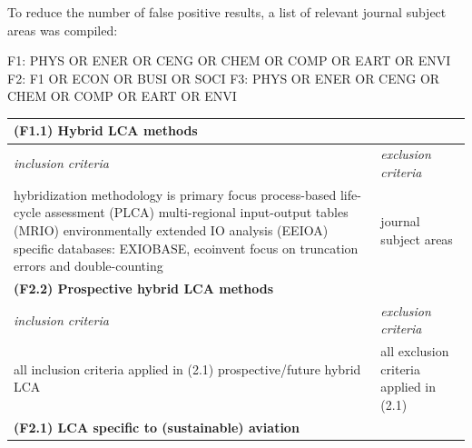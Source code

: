 \documentclass{article}
\begin{document}
            To reduce the number of false positive results, a list of relevant journal subject areas was compiled:
            
\begin{code_search}
F1: PHYS OR ENER OR CENG OR CHEM OR COMP OR EART OR ENVI
F2: F1 OR ECON OR BUSI OR SOCI
F3: PHYS OR ENER OR CENG OR CHEM OR COMP OR EART OR ENVI
\end{code_search}

        
            \begin{table}[htbp]
                \centering
                \begin{tabularx}{\textwidth}{| X | X |}
                    \hline
                \multicolumn{2}{|l|}{\textbf{(F1.1) Hybrid LCA methods}}  \\
                    \hline
                    \textit{inclusion criteria} & \textit{exclusion criteria} \\
                    \hline
                        hybridization methodology is primary focus \newline
                        process-based life-cycle assessment (PLCA) \newline
                        multi-regional input-output tables (MRIO) \newline
                        environmentally extended IO analysis (EEIOA) \newline
                        specific databases: EXIOBASE, ecoinvent \newline
                        focus on truncation errors and double-counting
                    &
                        journal subject areas
                    \\
                    \hline
                \multicolumn{2}{|l|}{\textbf{(F2.2) Prospective hybrid LCA methods}}  \\
                    \hline
                    \textit{inclusion criteria} & \textit{exclusion criteria} \\
                    \hline
                        all inclusion criteria applied in (2.1) \newline
                        prospective/future hybrid LCA
                    &
                        all exclusion criteria applied in (2.1)
                    \\
                    \hline
                \multicolumn{2}{|l|}{\textbf{(F2.1) LCA specific to (sustainable) aviation}}  \\
                    \hline

\end{tabularx}
\end{table}
\end{document}
